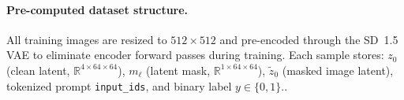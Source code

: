 \paragraph{Pre-computed dataset structure.}
All training images are resized to $512\!\times\!512$ and pre-encoded
through the SD~1.5 VAE to eliminate encoder forward passes during training.
Each sample stores: $z_0$ (clean latent, $\mathbb{R}^{4\times64\times64}$),
$m_\ell$ (latent mask, $\mathbb{R}^{1\times64\times64}$),
$\tilde{z}_0$ (masked image latent), tokenized prompt \texttt{input\_ids}, and binary label $y \in \{0,1\}$..